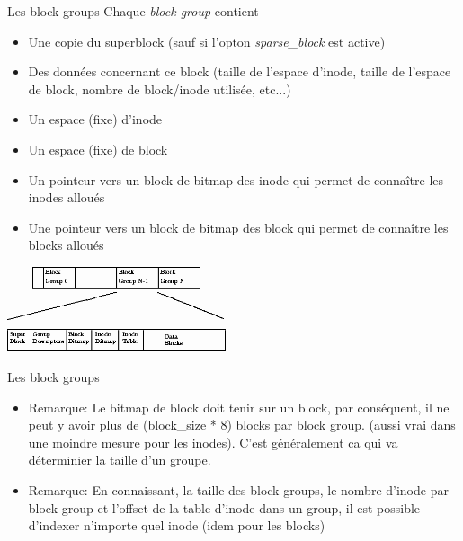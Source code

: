 \begin{frame}[fragile=singleslide]{Les block groups}
  Chaque \emph{block group} contient
  \begin{itemize}
  \item Une copie du  superblock (sauf si l'opton \emph{sparse\_block}
    est active)
  \item Des  données concernant ce  block (taille de  l'espace d'inode,
    taille  de  l'espace de  block,  nombre  de block/inode  utilisée,
    etc...)
  \item Un espace (fixe) d'inode
  \item Un espace (fixe) de block
  \item Un  pointeur vers un block  de bitmap des inode  qui permet de
    connaître les inodes alloués
  \item Une pointeur  vers un block de bitmap des  block qui permet de
    connaître les blocks alloués
  \end{itemize}
  \begin{center}
    \includegraphics[height=2.5cm]{pics/img82}
  \end{center}
\end{frame}

\begin{frame}[fragile=singleslide]{Les block groups}
  \begin{itemize}
  \item  Remarque: Le bitmap  de block  doit tenir  sur un  block, par
    conséquent, il  ne peut y avoir  plus de (block\_size  * 8) blocks
    par  block group.  (aussi vrai  dans une  moindre mesure  pour les
    inodes).  C'est généralement ca  qui va déterminier la taille d'un
    groupe.
  \item  Remarque: En  connaissant,  la taille  des  block groups,  le
    nombre d'inode  par block  group et l'offset  de la  table d'inode
    dans  un group,  il est  possible d'indexer  n'importe  quel inode
    (idem pour les blocks)
  \end{itemize}
\end{frame}

